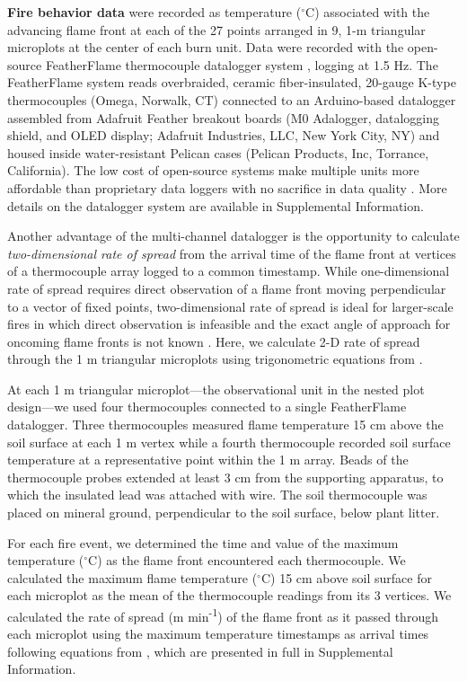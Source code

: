 \documentclass[referee, 
		     sn-basic]{sn-jnl}
\newcommand{\degC}{$^\circ$C}
\begin{document}
\begin{linenumbers}
\textbf{Fire behavior data} were recorded as temperature (\(^\circ\)C) associated with the advancing flame front at each of the 27 points arranged in 9, 1-m triangular microplots at the center of each burn
unit. Data were recorded with the open-source FeatherFlame thermocouple
datalogger system \citep{mcgranahan2021b}, logging at 1.5 Hz. The
FeatherFlame system reads overbraided, ceramic fiber-insulated, 20-gauge
K-type thermocouples (Omega, Norwalk, CT) connected to an Arduino-based
datalogger assembled from Adafruit Feather breakout boards (M0
Adalogger, datalogging shield, and OLED display; Adafruit Industries,
LLC, New York City, NY) and housed inside water-resistant Pelican cases
(Pelican Products, Inc, Torrance, California). 
The low cost of open-source systems make multiple units more affordable than proprietary data loggers with no sacrifice in data quality \citep{mcgranahan2021}.
More details on the datalogger system are available in Supplemental Information.

Another advantage of the multi-channel datalogger is the opportunity to calculate \emph{two-dimensional rate of spread} from the arrival time of the flame front at vertices of a thermocouple array logged to a common timestamp. 
While one-dimensional rate of spread requires direct observation of a flame front moving perpendicular to a vector of fixed points, two-dimensional rate of spread is ideal for larger-scale fires in which direct observation is infeasible and the exact angle of approach for oncoming flame fronts is not known \citep{finney2021}. 
Here, we calculate 2-D rate of spread through the 1 m triangular microplots using trigonometric equations from \citet{simard1984}.

At each 1 m triangular microplot---the observational unit in the nested plot design---we used four thermocouples connected to a single FeatherFlame datalogger. 
Three thermocouples measured flame temperature 15 cm above the soil surface at each 1 m vertex while a fourth thermocouple recorded soil surface temperature at a representative point within the 1 m array. 
Beads of the thermocouple probes extended at least 3 cm from the supporting apparatus, to which the insulated lead was attached with wire. 
The soil thermocouple was placed on mineral ground, perpendicular to the soil surface, below plant litter.

For each fire event, we determined the time and value of the maximum temperature (\degC) as the flame front encountered each thermocouple. 
We calculated the maximum flame temperature (\degC) 15 cm above soil surface for each microplot as the mean of the thermocouple readings from its 3 vertices. 
We calculated the rate of spread (m min\textsuperscript{-1}) of the flame front as it passed through
each microplot using the maximum temperature timestamps as arrival times following equations from \citet{simard1984}, which are presented in full in Supplemental Information.


\end{linenumbers}
\end{document}
